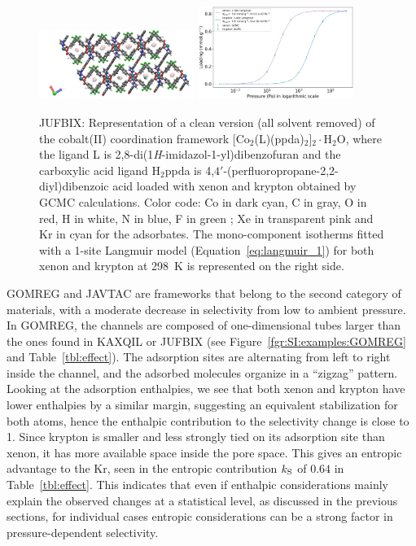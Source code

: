 \documentclass[main.tex]{subfiles}
\begin{document}
\begin{figure}[h]
  \centering
    \includegraphics[width=0.45\textwidth]{figures/2-thermo/JUFBIX_clean.jpg}
    \includegraphics[width=0.45\textwidth]{figures/2-thermo/JUFBIX_clean_isotherm_xenon_krypton_298K.jpg}
    \caption{JUFBIX: Representation of a clean version (all solvent removed) of the cobalt(II) coordination framework [Co$_2$(L)(ppda)$_2$]$_2\cdot$H$_2$O, where the ligand L is 2,8-di(1\emph{H}-imidazol-1-yl)dibenzofuran and the carboxylic acid ligand H$_2$ppda is 4,$4'$-(perfluoropropane-2,2-diyl)dibenzoic acid loaded with xenon and krypton obtained by GCMC calculations. Color code: Co in dark cyan, C in gray, O in red, H in white, N in blue, F in green ; Xe in transparent pink and Kr in cyan for the adsorbates. The mono-component isotherms fitted with a 1-site Langmuir model (Equation~\ref{eq:langmuir_1}) for both xenon and krypton at \SI{298}{\kelvin} is represented on the right side.}\label{fgr:SI:examples:JUFBIX}
  \end{figure}

GOMREG and JAVTAC are frameworks that belong to the second category of materials, with a moderate decrease in selectivity from low to ambient pressure. In GOMREG, the channels are composed of one-dimensional tubes larger than the ones found in KAXQIL or JUFBIX (see Figure~\ref{fgr:SI:examples:GOMREG} and Table~\ref{tbl:effect}). The adsorption sites are alternating from left to right inside the channel, and the adsorbed molecules organize in a ``zigzag'' pattern. Looking at the adsorption enthalpies, we see that both xenon and krypton have lower enthalpies by a similar margin, suggesting an equivalent stabilization for both atoms, hence the enthalpic contribution to the selectivity change is close to 1.
Since krypton is smaller and less strongly tied on its adsorption site than xenon, it has more available space inside the pore space. This gives an entropic advantage to the Kr, seen in the entropic contribution $k_{\text{S}}$ of $0.64$ in Table~\ref{tbl:effect}. This indicates that even if enthalpic considerations mainly explain the observed changes at a statistical level, as discussed in the previous sections, for individual cases entropic considerations can be a strong factor in pressure-dependent selectivity.
\end{document}
